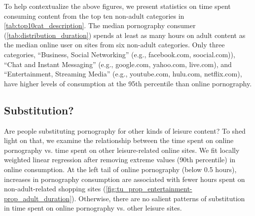\documentclass[12pt,twoside]{article}
\begin{document}
To help contextualize the above figures, we present statistics on time spent consuming content from the top ten non-adult categories in \cref{tab:top10cat_description}. 
The median pornography consumer (\cref{tab:distribution_duration}) spends at least as many hours on adult content as the median online user on sites from six non-adult categories. 
Only three categories, ``Business, Social Networking'' (e.g., facebook.com, soocial.com)), ``Chat and Instant Messaging'' (e.g., google.com, yahoo.com, live.com), and ``Entertainment, Streaming Media'' (e.g., youtube.com, hulu.com, netflix.com), have higher levels of consumption at the 95th percentile than online pornography.

\subsection{Substitution?}
Are people substituting pornography for other kinds of leisure content? To shed light on that, we examine the relationship between the time spent on online pornography vs. time spent on other leisure-related online sites. We fit locally weighted linear regression after removing extreme values (90th percentile) in online consumption. At the left tail of online pornography (below 0.5 hours), increases in pornography consumption are associated with fewer hours spent on non-adult-related shopping sites (\cref{fig:tu_prop_entertainment-prop_adult_duration}). Otherwise, there are no salient patterns of substitution in time spent on online pornography vs. other leisure sites.
\end{document}
